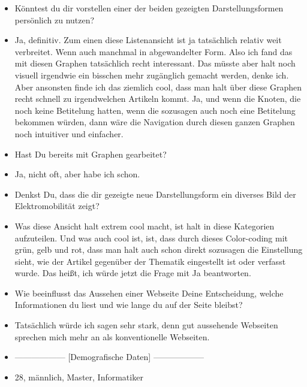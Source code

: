 {\begin{itemize}[]
            \item {} Könntest du dir vorstellen einer der beiden gezeigten Darstellungsformen persönlich zu nutzen?
            \item {} Ja, definitiv. Zum einen diese Listenansicht ist ja tatsächlich relativ weit verbreitet.
                  Wenn auch manchmal in abgewandelter Form.
                  Also ich fand das mit diesen Graphen tatsächlich recht interessant.
                  Das müsste aber halt noch visuell irgendwie ein bisschen mehr zugänglich gemacht werden, denke ich.
                  Aber ansonsten finde ich das ziemlich cool, dass man halt über diese Graphen recht schnell zu irgendwelchen Artikeln kommt.
                  Ja, und wenn die Knoten, die noch keine Betitelung hatten, wenn die sozusagen auch noch eine Betitelung bekommen würden, dann wäre die Navigation durch diesen ganzen Graphen noch intuitiver und einfacher.
            \item {} Hast Du bereits mit Graphen gearbeitet?
            \item {} Ja, nicht oft, aber habe ich schon.
            \item {} Denkst Du, dass die dir gezeigte neue Darstellungsform ein diverses Bild der Elektromobilität zeigt?
            \item {} Was diese Ansicht halt extrem cool macht, ist halt in diese Kategorien aufzuteilen.
                  Und was auch cool ist, ist, dass durch dieses Color-coding mit grün, gelb und rot, dass man halt auch schon direkt sozusagen die Einstellung sieht, wie der Artikel gegenüber der Thematik eingestellt ist oder verfasst wurde.
                  Das heißt, ich würde jetzt die Frage mit Ja beantworten.
            \item {} Wie beeinflusst das Aussehen einer Webseite Deine Entscheidung, welche Informationen du liest und wie lange du auf der Seite bleibst?
            \item {} Tatsächlich würde ich sagen sehr stark, denn gut aussehende Webseiten sprechen mich mehr an als konventionelle Webseiten.
            \item {------------------} [Demografische Daten] {------------------}
            \item {} 28, männlich, Master, Informatiker
      \end{itemize}}
\nolinenumbers
